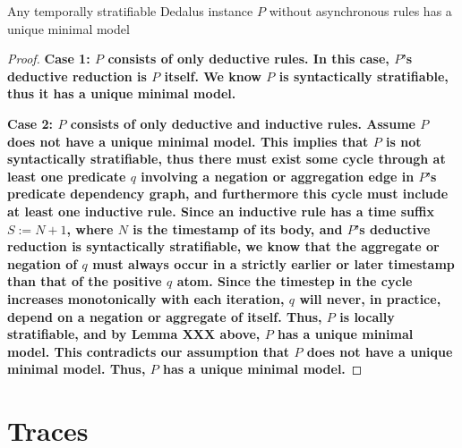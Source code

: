 \begin{lemma}
%
Any temporally stratifiable Dedalus instance $P$ without asynchronous rules has
a unique minimal model
%
\end{lemma} 

\begin{proof}
%
\bf{Case 1:} $P$ consists of only deductive rules.  In this case, $P$'s
deductive reduction is $P$ itself.  We know $P$ is syntactically stratifiable,
thus it has a unique minimal model.

\bf{Case 2:} $P$ consists of only deductive and inductive rules.  Assume $P$
does not have a unique minimal model.  This implies that $P$ is not
syntactically stratifiable, thus there must exist some cycle through at least
one predicate $q$ involving a negation or aggregation edge in $P$'s predicate
dependency graph, and furthermore this cycle must include at least one
inductive rule.  Since an inductive rule has a time suffix $S := N+1$, where
$N$ is the timestamp of its body, and $P$'s deductive reduction is
syntactically stratifiable, we know that the aggregate or negation of $q$ must
always occur in a strictly earlier or later timestamp than that of the positive
$q$ atom.  Since the timestep in the cycle increases monotonically with each
iteration, $q$ will never, in practice, depend on a negation or aggregate of
itself.  Thus, $P$ is locally stratifiable, and by Lemma XXX above, $P$ has a
unique minimal model.  This contradicts our assumption that $P$ does not have a
unique minimal model.  Thus, $P$ has a unique minimal model.
%
\end{proof}


\section{Traces}


